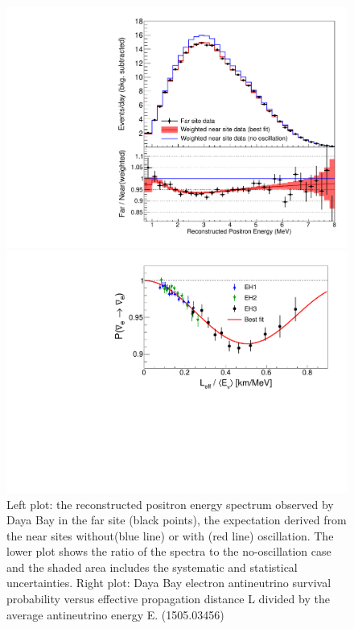 \begin{figure}[htbp]
\begin{minipage}[c]{.46\linewidth}
   	      \includegraphics[width=0.9\linewidth]{figures/spectral_distortion_NL2015_v2.pdf}
   \end{minipage} \hfill
   \begin{minipage}{.46\linewidth}
      \includegraphics[width=0.9\linewidth]{figures/loe_NL2015.pdf}
   \end{minipage}
    \caption{Left plot: the reconstructed positron
energy spectrum observed by Daya Bay in the far site (black points), 
the expectation derived from the near sites without(blue line) or
with (red line) oscillation. The lower plot shows the ratio of the spectra to the no-oscillation case and the shaded area 
includes the systematic and statistical uncertainties. 
Right plot: Daya Bay electron antineutrino survival probability versus effective
propagation distance L divided by the average antineutrino energy
E. (1505.03456)
}
 \label{fig:dayabay}
\end{figure}



